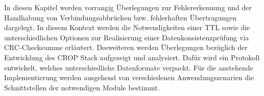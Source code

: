 \label{cap:konzept}

In diesen Kapitel werden vorrangig {\"U}berlegungen zur Fehlererkennung
und der Handhabung von Verbindungsabbr{\"u}chen bzw. fehlerhaften
{\"U}bertragungen dargelegt. In diesem Kontext werden die Notwendigkeiten einer
TTL sowie die unterschiedlichen Optionen zur Realisierung einer
Datenkonsistenzpr{\"u}fung via CRC-Checksumme erl{\"a}utert. Desweiteren
werden {\"U}berlegungen bez{\"u}glich der Entwicklung des CROP Stack
aufgezeigt und analysiert. Dafür wird ein Protokoll entwickelt, welches
unterschiedliche Datenformate verpackt. Für die
anstehende Implementierung werden ausgehend von verschiedenen Anwendungszenarien
die Schnittstellen der notwendigen Module bestimmt.